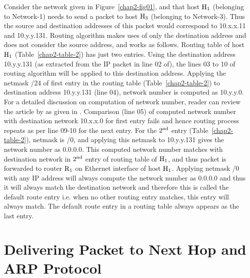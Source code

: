 \begin{multicols}{2}
Consider the network given in Figure~\ref{chap2-fig01}, and that host ${\rm H}_{1}$ (belonging to Network-1) needs to send a packet to host ${\rm H}_{3}$ (belonging to Network-3). Thus the source and destination addresses of this packet would correspond to 10.x.x.11 and 10.y.y.131. Routing algorithm makes uses of only the destination address and does not consider the source address, and works as follows. Routing table of host ${\rm H}_{1}$ (Table~\ref{chap2-table-2}) has just two entries. Using the destination address 10.y.y.131 (as extracted from the IP packet in line 02 of), the lines 03 to 10 of routing algorithm will be applied to this destination address. Applying the netmask /24 of first entry in the routing table (Table~\ref{chap2-table-2}) to destination address 10.y.y.131 (line 04), network number is computed as 10.y.y.0. For a detailed discussion on computation of network number, reader can review the article by as given in \cite{art2-key01}. Comparison (line 05) of computed network number with destination network 10.x.x.0 for first entry fails and hence routing process repeats as per line 09-10 for the next entry. For the $2^{\rm nd}$ entry (Table~\ref{chap2-table-2}), netmask is /0, and applying this netmask to 10.y.y.131 gives the network number as 0.0.0.0. This computed network number matches with destination network in $2^{\rm nd}$ entry of routing table of ${\rm H}_{1}$, and thus packet is forwarded to router ${\rm R}_{1}$ on Ethernet interface of host ${\rm H}_{1}$. Applying netmask /0 with any IP address will always compute the network number as 0.0.0.0 and thus it will always match the destination network and therefore this is called the default route entry i.e. when no other routing entry matches, this entry will always match. The default route entry in a routing table always appears as the last entry.

\section{Delivering Packet to Next Hop and ARP Protocol}\label{chap2-sec3}


\end{multicols}
